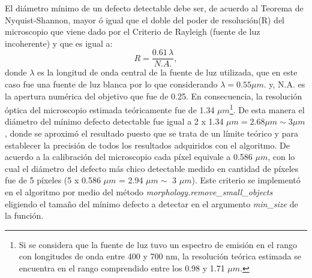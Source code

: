 \hspace{0.5cm} El diámetro mínimo de un defecto detectable debe ser, de acuerdo al Teorema de Nyquist-Shannon, mayor ó igual que el doble del poder de resolución(R) del microscopio que viene dado por el Criterio de Rayleigh (fuente de luz incoherente) y que es igual a:
\begin{equation}
R = \frac{0.61 \hspace{2pt} \lambda}{ N.A.},
\label{eq:rayleighcrit}
\end{equation}
donde $\lambda$ es la longitud de onda central de la fuente de luz utilizada, que en este caso fue una fuente de luz blanca por lo que considerando $\lambda = 0.55 \mu m$. y, N.A. es la apertura numérica del objetivo que fue de 0.25. En consecuencia, la resolución óptica del microscopio estimada teóricamente fue de 1.34 $\mu m$\footnote{Si se considera que la fuente de luz tuvo un espectro de emisión en el rango con longitudes de onda entre 400 y 700 nm, la resolución teórica estimada se encuentra en el rango comprendido entre los 0.98 y 1.71 $\mu m$.}. De esta manera el diámetro del mínimo defecto detectable fue igual a 2 x 1.34 $\mu m = 2.68 \mu m \sim 3 \mu m$, donde se aproximó el resultado puesto que se trata de un límite teórico y para establecer la precisión de todos los resultados adquiridos con el algoritmo. De acuerdo a la calibración del microscopio cada píxel equivale a 0.586 $\mu m$, con lo cual el diámetro del defecto más chico detectable medido en cantidad de píxeles fue de 5 píxeles (5 x 0.586 $\mu m$ = 2.94 $\mu m \sim$ 3 $\mu m$). Este criterio se implementó en el algoritmo por medio del método \textit{morphology.remove\_small\_objects} eligiendo el tamaño del mínimo defecto a detectar en el argumento \textit{min\_size} de la función.


